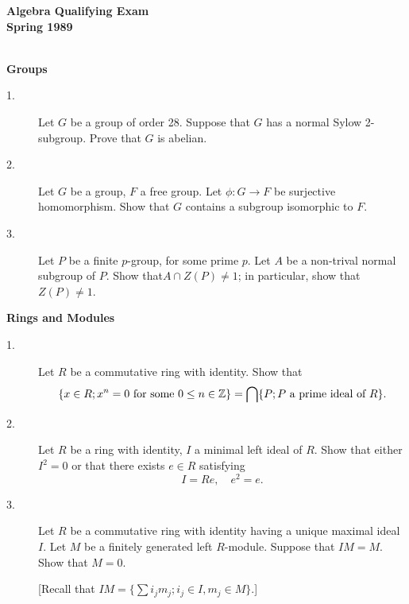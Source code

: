 \documentclass{article}
\def\Z{\mathbb Z}
\begin{document}






\begin{center}\begin{LARGE}
{\bf Algebra Qualifying Exam}\\ 
{\bf Spring 1989}\\ \end{LARGE}
\end{center}
\vspace{0.1in}
\noindent\hrulefill\\

{\bf Groups}

\begin{description}
\item[1.]
Let $G$ be a group of order 28. Suppose that $G$ has a normal Sylow
2-subgroup. Prove that $G$ is abelian.

\item[2.]
Let $G$ be a group, $F$ a free group. Let $\phi : G \to F$ be surjective
homomorphism. Show that $G$ contains a subgroup isomorphic to $F$.

\item[3.]
Let $P$ be a finite $p$-group, for some prime $p$. Let $A$ be a non-trival
normal subgroup of $P$. Show that$A \cap Z(P) \neq 1$; in particular, show
that $Z(P) \neq 1$.

\end{description}

{\bf Rings and Modules}

\begin{description}

\item[1.]
Let $R$ be a commutative ring with identity. Show that
$$\{ x \in R; x^n = 0 \hbox{\ for} \hbox{\ some\ } 0 \leq n \in \Z\} =
  \bigcap \{P; P \hbox{\ a\ } \hbox{prime\ } \hbox{ideal\ } \hbox{of\ } R\}.$$

\item[2.]
Let $R$ be a ring with identity, $I$ a minimal left ideal of $R$. Show that
either $I^2 = 0$ or that there exists $e \in R$ satisfying
$$I = Re, \quad e^2 = e.$$

\item[3.]
Let $R$ be a commutative ring with identity having a unique maximal ideal $I$.
Let $M$ be a finitely generated left $R$-module. Suppose that $IM=M$. Show
that $M=0$.

[Recall that $IM = \{\sum i_jm_j; i_j \in I, m_j \in M\}$.]





\end{description}    
\end{document}
